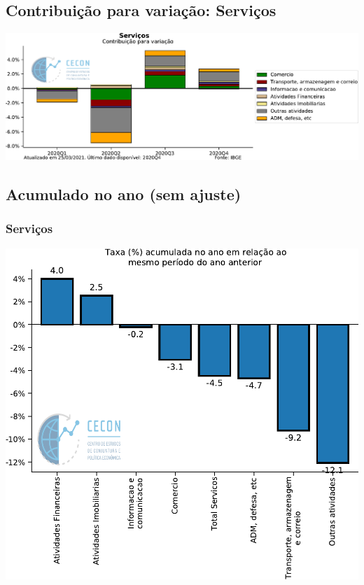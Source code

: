 \documentclass{SelfArx}
\begin{document}
\subsection*{Contribuição para variação: Serviços}
\label{sec:org52422fe}

\begin{center}
\includegraphics[width=.9\linewidth]{./figs/PIB/Contrib_Servicos.pdf}
\end{center}

\subsection*{Acumulado no ano (sem ajuste)}
\label{sec:orgecb8db2}

\subsubsection*{Serviços}
\label{sec:org7aad43e}

\begin{center}
\includegraphics[width=.9\linewidth]{./figs/PIB/Servicos_Acum.pdf}
\end{center}
\end{document}

